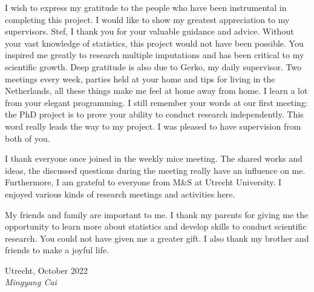 %
%
%

\Preface

I wish to express my gratitude to the people who have been instrumental in completing this project. I would like to show my greatest appreciation to my supervisors. Stef, I thank you for your valuable guidance and advice. Without your vast knowledge of statistics, this project would not have been possible. You inspired me greatly to research multiple imputations and has been critical to my scientific growth. Deep gratitude is also due to Gerko, my daily supervisor. Two meetings every week, parties held at your home and tips for living in the Netherlands, all these things make me feel at home away from home. I learn a lot from your elegant programming. I still remember your words at our first meeting: the PhD project is to prove your ability to conduct research independently. This word really leads the way to my project. I was pleased to have supervision from both of you.

I thank everyone once joined in the weekly mice meeting. The shared works and ideas, the discussed questions during the meeting really have an influence on me. Furthermore, I am grateful to everyone from M\&S at Utrecht University. I enjoyed various kinds of research meetings and activities here. 

My friends and family are important to me. I thank my parents for giving me the opportunity to learn more about statistics and develop skills to conduct scientific research. You could not have given me a greater gift. I also thank my brother and friends to make a joyful life.

\vspace{1cm}

\begin{flushright}\noindent
Utrecht, October 2022\\
{\it Mingyang Cai}
\end{flushright}
